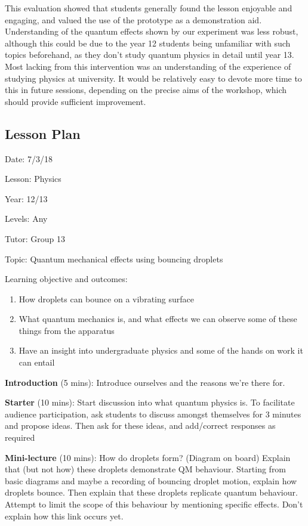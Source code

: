 This evaluation showed that students generally found the lesson enjoyable and engaging, and valued the use of the prototype as a demonstration aid. Understanding of the quantum effects shown by our experiment was less robust, although this could be due to the year 12 students being unfamiliar with such topics beforehand, as they don't study quantum physics in detail until year 13. Most lacking from this intervention was an understanding of the experience of studying physics at university. It would be relatively easy to devote more time to this in future sessions, depending on the precise aims of the workshop, which should provide sufficient improvement.

\clearpage

\subsection{Lesson Plan} \label{lessonplan}

\noindent Date: 7/3/18

\noindent Lesson: Physics

\noindent Year: 12/13

\noindent Levels: Any

\noindent Tutor: Group 13

\noindent Topic: Quantum mechanical effects using bouncing droplets


\noindent Learning objective and outcomes:
\begin{enumerate}
\item How droplets can bounce on a vibrating surface
\item What quantum mechanics is, and what effects we can observe some of these things from the apparatus
\item Have an insight into undergraduate physics and some of the hands on work it can entail
\end{enumerate}

\noindent \textbf{Introduction} (5 mins): Introduce ourselves and the reasons we're there for. 

\noindent \textbf{Starter} (10 mins): Start discussion into what quantum physics is. To facilitate audience participation, ask students to discuss amongst themselves for 3 minutes and propose ideas. Then ask for these ideas, and add/correct responses as required

\noindent \textbf{Mini-lecture} (10 mins): How do droplets form? (Diagram on board) Explain that (but not how) these droplets demonstrate QM behaviour. Starting from basic diagrams and maybe a recording of bouncing droplet motion, explain how droplets bounce. Then explain that these droplets replicate quantum behaviour. Attempt to limit the scope of this behaviour by mentioning specific effects. Don't explain how this link occurs yet.

